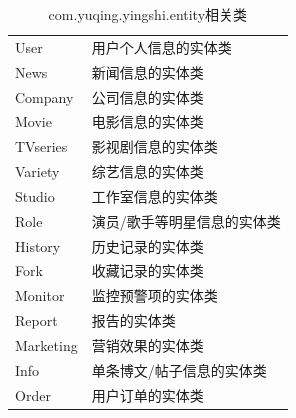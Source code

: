\begin{table}
	\caption{com.yuqing.yingshi.entity相关类}
	\centering
	\begin{tabular}{|p{3cm}|p{10cm}|} 
		\hline 
		\rowcolor[HTML]{DAE8FC} 
\multicolumn{2}{|c|}{com.yuqing.yingshi.entity相关类} \\ 
\hline 
User &用户个人信息的实体类\\
News &新闻信息的实体类\\
Company &公司信息的实体类\\
Movie&电影信息的实体类\\
TVseries&影视剧信息的实体类\\
Variety&综艺信息的实体类\\
Studio&工作室信息的实体类\\
Role&演员/歌手等明星信息的实体类\\
History&历史记录的实体类\\
Fork&收藏记录的实体类\\
Monitor&监控预警项的实体类\\
Report&报告的实体类\\
Marketing&营销效果的实体类\\
Info &单条博文/帖子信息的实体类\\
Order &用户订单的实体类\\
\hline 
\end{tabular}
\end{table}


